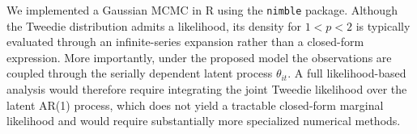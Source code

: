 \documentclass{sfuthesis}
\numberwithin{equation}{chapter}
\begin{document}



We implemented a Gaussian MCMC in R using the \texttt{nimble} package. Although the Tweedie distribution admits a likelihood, its density for \(1<p<2\) is typically evaluated through an infinite-series expansion rather than a closed-form expression. More importantly, under the proposed model the observations are coupled through the serially dependent latent process \(\theta_{it}\). A full likelihood-based analysis would therefore require integrating the joint Tweedie likelihood over the latent AR(1) process, which does not yield a tractable closed-form marginal likelihood and would require substantially more specialized numerical methods.
\end{document}
